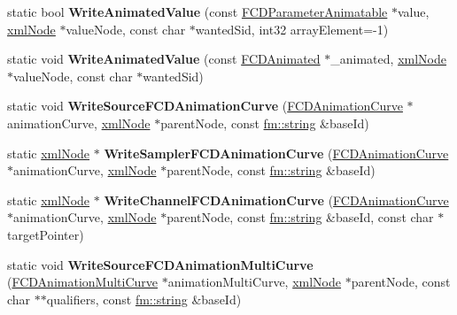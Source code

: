 \begin{DoxyCompactItemize}
\item 
\hypertarget{classFArchiveXML_ab423b0ecc02eac4b4564b2237ec90472}{
static bool {\bfseries WriteAnimatedValue} (const \hyperlink{classFCDParameterAnimatable}{FCDParameterAnimatable} $\ast$value, \hyperlink{struct__xmlNode}{xmlNode} $\ast$valueNode, const char $\ast$wantedSid, int32 arrayElement=-\/1)}
\label{classFArchiveXML_ab423b0ecc02eac4b4564b2237ec90472}

\item 
\hypertarget{classFArchiveXML_ab5b9b9b9f6fcbc63dac0d59069c1d5c3}{
static void {\bfseries WriteAnimatedValue} (const \hyperlink{classFCDAnimated}{FCDAnimated} $\ast$\_\-animated, \hyperlink{struct__xmlNode}{xmlNode} $\ast$valueNode, const char $\ast$wantedSid)}
\label{classFArchiveXML_ab5b9b9b9f6fcbc63dac0d59069c1d5c3}

\item 
\hypertarget{classFArchiveXML_a7eb51648ebca63761f8e5030f7ff4f52}{
static void {\bfseries WriteSourceFCDAnimationCurve} (\hyperlink{classFCDAnimationCurve}{FCDAnimationCurve} $\ast$animationCurve, \hyperlink{struct__xmlNode}{xmlNode} $\ast$parentNode, const \hyperlink{classfm_1_1stringT}{fm::string} \&baseId)}
\label{classFArchiveXML_a7eb51648ebca63761f8e5030f7ff4f52}

\item 
\hypertarget{classFArchiveXML_a0581e30d1e2b17decc1a8646906c5667}{
static \hyperlink{struct__xmlNode}{xmlNode} $\ast$ {\bfseries WriteSamplerFCDAnimationCurve} (\hyperlink{classFCDAnimationCurve}{FCDAnimationCurve} $\ast$animationCurve, \hyperlink{struct__xmlNode}{xmlNode} $\ast$parentNode, const \hyperlink{classfm_1_1stringT}{fm::string} \&baseId)}
\label{classFArchiveXML_a0581e30d1e2b17decc1a8646906c5667}

\item 
\hypertarget{classFArchiveXML_a524dee9545f60b2969d6345585d6bd5e}{
static \hyperlink{struct__xmlNode}{xmlNode} $\ast$ {\bfseries WriteChannelFCDAnimationCurve} (\hyperlink{classFCDAnimationCurve}{FCDAnimationCurve} $\ast$animationCurve, \hyperlink{struct__xmlNode}{xmlNode} $\ast$parentNode, const \hyperlink{classfm_1_1stringT}{fm::string} \&baseId, const char $\ast$targetPointer)}
\label{classFArchiveXML_a524dee9545f60b2969d6345585d6bd5e}

\item 
\hypertarget{classFArchiveXML_a09423d223ef4e13a54fff41ded45ea40}{
static void {\bfseries WriteSourceFCDAnimationMultiCurve} (\hyperlink{classFCDAnimationMultiCurve}{FCDAnimationMultiCurve} $\ast$animationMultiCurve, \hyperlink{struct__xmlNode}{xmlNode} $\ast$parentNode, const char $\ast$$\ast$qualifiers, const \hyperlink{classfm_1_1stringT}{fm::string} \&baseId)}
\label{classFArchiveXML_a09423d223ef4e13a54fff41ded45ea40}


\end{DoxyCompactItemize}
